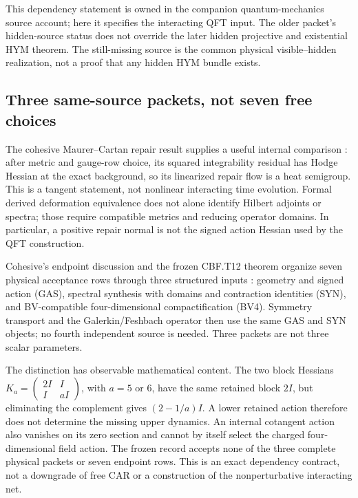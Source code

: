 \documentclass[11pt]{article}
\theoremstyle{definition}
\theoremstyle{remark}
\begin{document}
This dependency statement is owned in the companion quantum-mechanics
source account; here it specifies the interacting QFT input. The older
packet's hidden-source status does not override the later hidden projective
and existential HYM theorem. The still-missing source is the common physical
visible--hidden realization, not a proof that any hidden HYM bundle exists.

\subsection{Three same-source packets, not seven free choices}
\label{sec:endpoint-consumer}

The cohesive Maurer--Cartan repair result supplies a useful internal
comparison \cite{FrozenCohesiveMC,Cohesive14}: after metric and gauge-row
choice, its squared integrability residual has Hodge Hessian at the exact
background, so its linearized repair flow is a heat semigroup. This is a
tangent statement, not nonlinear interacting time evolution. Formal derived
deformation equivalence does not alone identify Hilbert adjoints or spectra;
those require compatible metrics and reducing operator domains. In
particular, a positive repair normal is not the signed action Hessian used
by the QFT construction.

Cohesive's endpoint discussion and the frozen CBF.T12 theorem organize seven
physical acceptance rows through three structured inputs
\cite{FrozenEndpoint,Cohesive14}: geometry and signed action (GAS), spectral
synthesis with domains and contraction identities (SYN), and BV-compatible
four-dimensional compactification (BV4). Symmetry transport and the
Galerkin/Feshbach operator then use the same GAS and SYN objects; no fourth
independent source is needed. Three packets are not three scalar parameters.

The distinction has observable mathematical content. The two block Hessians
\(K_a=\left(\begin{smallmatrix}2I&I\\I&aI\end{smallmatrix}\right)\),
with \(a=5\) or \(6\), have the same retained block \(2I\), but eliminating
the complement gives \((2-1/a)I\). A lower retained action therefore does
not determine the missing upper dynamics. An internal cotangent action also
vanishes on its zero section and cannot by itself select the charged
four-dimensional field action. The frozen record accepts none of the three
complete physical packets or seven endpoint rows. This is an exact
dependency contract, not a downgrade of free CAR or a construction of the
nonperturbative interacting net.
\end{document}
